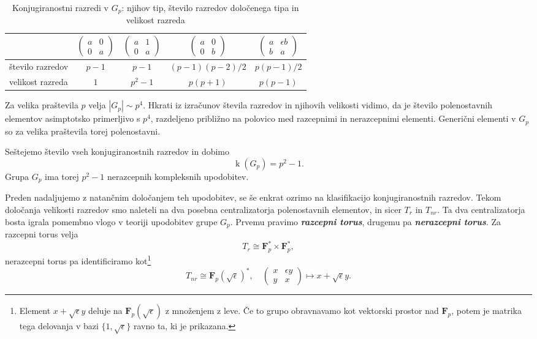 \documentclass[11pt]{book}
\def\FF{\mathbf{F}}
\DeclareMathOperator\kk{k}
\def\definicija{\color{rdeca}\bf\em}
\theoremstyle{definition}
\theoremstyle{zgled}
\theoremstyle{odprtproblem}
\theoremstyle{domacanaloga}
\theoremstyle{izrek}
\begin{document}
\begin{table}[ht]
    \centering
\begin{tabular}{l*{4}{c}}
    & 
    $\begin{pmatrix}
        a & 0 \\ 0 & a
    \end{pmatrix}$
    &
    $\begin{pmatrix}
        a & 1 \\ 0 & a
    \end{pmatrix}$
    &
    $\begin{pmatrix}
        a & 0 \\ 0 & b
    \end{pmatrix}$
    &
    $\begin{pmatrix}
        a & \epsilon b \\ b & a
    \end{pmatrix}$ \\ \hline
    število razredov & $p-1$ & $p-1$ & $(p-1)(p-2)/2$ & $p(p-1)/2$ \\
    velikost razreda & $1$ & $p^2 - 1$ & $p(p+1)$ & $p(p-1)$ \\
\end{tabular}
\caption{Konjugiranostni razredi v $G_p$: njihov tip, število razredov določenega tipa in velikost razreda}
\end{table}

Za velika praštevila $p$ velja $|G_p| \sim p^4$. Hkrati iz izračunov števila razredov in njihovih velikosti vidimo, da je število polenostavnih elementov asimptotsko primerljivo s $p^4$, razdeljeno približno na polovico med razcepnimi in nerazcepnimi elementi. Generični elementi v $G_p$ so za velika praštevila torej polenostavni. 

Seštejemo število vseh konjugiranostnih razredov in dobimo
\[
    \kk(G_p) = p^2 - 1.
\]
Grupa $G_p$ ima torej $p^2-1$ nerazcepnih kompleksnih upodobitev. 

Preden nadaljujemo z natančnim določanjem teh upodobitev, se še enkrat ozrimo na klasifikacijo konjugiranostnih razredov. Tekom določanja velikosti razredov smo naleteli na dva posebna centralizatorja polenostavnih elementov, in sicer $T_r$ in $T_{nr}$. Ta dva centralizatorja bosta igrala pomembno vlogo v teoriji upodobitev grupe $G_p$. Prvemu pravimo {\definicija razcepni torus}, drugemu pa {\definicija nerazcepni torus}. Za razcepni torus velja
\[
    T_r \cong \FF_p^* \times \FF_p^*,
\]
nerazcepni torus pa identificiramo kot\footnote{Element $x + \sqrt{\epsilon} y$ deluje na $\FF_p(\sqrt{\epsilon})$ z množenjem z leve. Če to grupo obravnavamo kot vektorski prostor nad $\FF_p$, potem je matrika tega delovanja v bazi $\{ 1, \sqrt{\epsilon} \}$ ravno ta, ki je prikazana.}
\[
    T_{nr} \cong \FF_p(\sqrt{\epsilon})^*, \quad
    \begin{pmatrix}
        x & \epsilon y \\ y & x
    \end{pmatrix}
    \mapsto x + \sqrt{\epsilon} y.
\]
\end{document}

